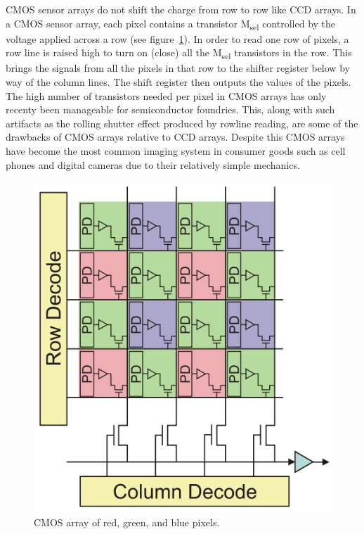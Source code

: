 CMOS sensor arrays do not shift the charge from row to row like CCD arrays.
%
In a CMOS sensor array, each pixel contains a transistor M\textsubscript{sel} controlled by the voltage applied across a row (see figure~\ref{fig:cmosarray}).
%
In order to read one row of pixels, a row line is raised high to turn on (close) all the M\textsubscript{sel} transistors in the row.
%
This brings the signals from all the pixels in that row to the shifter register below by way of the column lines.
%
The shift register then outputs the values of the pixels.
%
The high number of transistors needed per pixel in CMOS arrays has only recenty been manageable for semiconductor foundries.
%
This, along with such artifacts as the rolling shutter effect produced by rowline reading, are some of the drawbacks of CMOS arrays relative to CCD arrays.
%
Despite this CMOS arrays have become the most common imaging system in consumer goods such as cell phones and digital cameras due to their relatively simple mechanics.
\begin{figure}
	\center
	\includegraphics[width=.8\linewidth,keepaspectratio]{figures/background/cmos.png}
	\caption{CMOS array of red, green, and blue pixels.}
	\label{fig:cmosarray}
\end{figure}
